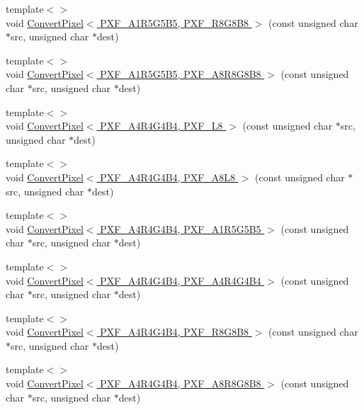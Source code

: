 \begin{DoxyCompactItemize}
{\footnotesize template$<$$>$ }\\void \hyperlink{_convert_pixel_8inl_a5c4547c1faafe2691ed947d5c4f4bf38}{Convert\+Pixel$<$ P\+X\+F\+\_\+\+A1\+R5\+G5\+B5, P\+X\+F\+\_\+\+R8\+G8\+B8 $>$} (const unsigned char $\ast$src, unsigned char $\ast$dest)
\item 
{\footnotesize template$<$$>$ }\\void \hyperlink{_convert_pixel_8inl_a571b40fd33b03ebefc3e6432b9e435ff}{Convert\+Pixel$<$ P\+X\+F\+\_\+\+A1\+R5\+G5\+B5, P\+X\+F\+\_\+\+A8\+R8\+G8\+B8 $>$} (const unsigned char $\ast$src, unsigned char $\ast$dest)
\item 
{\footnotesize template$<$$>$ }\\void \hyperlink{_convert_pixel_8inl_a44b781519b77cfc50703ab162b9e1f77}{Convert\+Pixel$<$ P\+X\+F\+\_\+\+A4\+R4\+G4\+B4, P\+X\+F\+\_\+\+L8 $>$} (const unsigned char $\ast$src, unsigned char $\ast$dest)
\item 
{\footnotesize template$<$$>$ }\\void \hyperlink{_convert_pixel_8inl_a9ffbf19ed80a8f7498b98fb9a7f46f56}{Convert\+Pixel$<$ P\+X\+F\+\_\+\+A4\+R4\+G4\+B4, P\+X\+F\+\_\+\+A8\+L8 $>$} (const unsigned char $\ast$src, unsigned char $\ast$dest)
\item 
{\footnotesize template$<$$>$ }\\void \hyperlink{_convert_pixel_8inl_ac404510aeb7adc7e52faad3b5c4c76fc}{Convert\+Pixel$<$ P\+X\+F\+\_\+\+A4\+R4\+G4\+B4, P\+X\+F\+\_\+\+A1\+R5\+G5\+B5 $>$} (const unsigned char $\ast$src, unsigned char $\ast$dest)
\item 
{\footnotesize template$<$$>$ }\\void \hyperlink{_convert_pixel_8inl_ad80f32e7ed62147a40e08a77c3bb02e4}{Convert\+Pixel$<$ P\+X\+F\+\_\+\+A4\+R4\+G4\+B4, P\+X\+F\+\_\+\+A4\+R4\+G4\+B4 $>$} (const unsigned char $\ast$src, unsigned char $\ast$dest)
\item 
{\footnotesize template$<$$>$ }\\void \hyperlink{_convert_pixel_8inl_a75ceab650b655cd39070466918bf8b1a}{Convert\+Pixel$<$ P\+X\+F\+\_\+\+A4\+R4\+G4\+B4, P\+X\+F\+\_\+\+R8\+G8\+B8 $>$} (const unsigned char $\ast$src, unsigned char $\ast$dest)
\item 
{\footnotesize template$<$$>$ }\\void \hyperlink{_convert_pixel_8inl_a41e17a0867d87828ed1d5705ccd90293}{Convert\+Pixel$<$ P\+X\+F\+\_\+\+A4\+R4\+G4\+B4, P\+X\+F\+\_\+\+A8\+R8\+G8\+B8 $>$} (const unsigned char $\ast$src, unsigned char $\ast$dest)
\item 

\end{DoxyCompactItemize}
